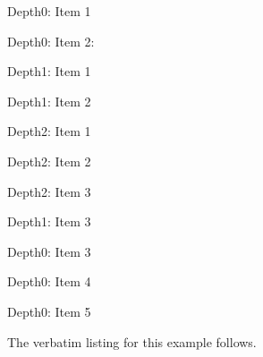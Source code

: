 \documentclass{article}
\begin{document}
  \begin{rtVW}
    Depth0: Item 1
\end{rtVW}
  \begin{rtVW}
    Depth0: Item 2:
      \begin{rtVWi}
        Depth1: Item 1
\end{rtVWi}
      \begin{rtVWi}
        Depth1: Item 2
          \begin{rtVWii}
              Depth2: Item 1
\end{rtVWii}
          \begin{rtVWii}
              Depth2: Item 2
\end{rtVWii}
          \begin{rtVWii}
              Depth2: Item 3
\end{rtVWii}
        \eRTVToks
\begin{itemize}
\end{itemize}
\end{rtVWi}
      \begin{rtVWi}
        Depth1: Item 3
\end{rtVWi}
\eRTVToks
\begin{itemize}
\end{itemize}
\end{rtVW}
  \begin{rtVW}
      Depth0: Item 3
\end{rtVW}
  \begin{rtVW}
      Depth0: Item 4
\end{rtVW}
  \begin{rtVW}
      Depth0: Item 5
\end{rtVW}
\eRTVToks
   \begin{enumerate}\small
{}
\end{enumerate}
The verbatim listing for this example follows.
\end{document}
